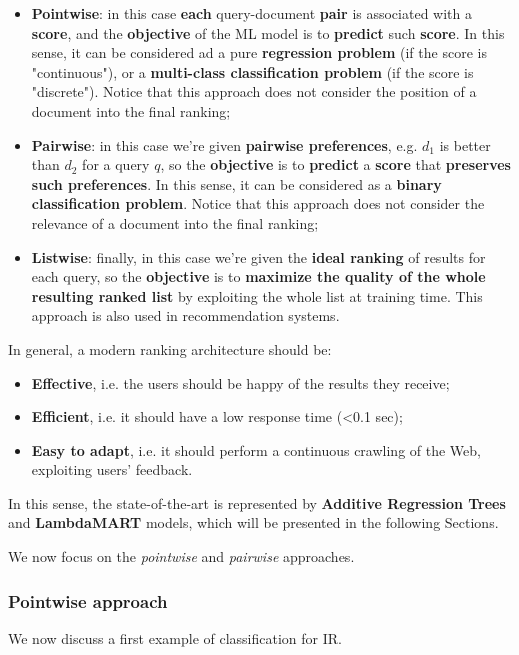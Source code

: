 \begin{itemize}
    \item \textbf{Pointwise}: in this case \textbf{each} query-document \textbf{pair} is associated with a \textbf{score}, and the \textbf{objective} of the ML model is to \textbf{predict} such \textbf{score}. In this sense, it can be considered ad a pure \textbf{regression problem} (if the score is "continuous"), or a \textbf{multi-class classification problem} (if the score is "discrete"). Notice that this approach does not consider the position of a document into the final ranking;
    \item \textbf{Pairwise}: in this case we're given \textbf{pairwise preferences}, e.g. $d_1$ is better than $d_2$ for a query $q$, so the \textbf{objective} is to \textbf{predict} a \textbf{score} that \textbf{preserves such preferences}. In this sense, it can be considered as a \textbf{binary classification problem}. Notice that this approach does not consider the relevance of a document into the final ranking;
    \item \textbf{Listwise}: finally, in this case we're given the \textbf{ideal ranking} of results for each query, so the \textbf{objective} is to \textbf{maximize the quality of the whole resulting ranked list} by exploiting the whole list at training time. This approach is also used in recommendation systems.
\end{itemize}

In general, a modern ranking architecture should be:

\begin{itemize}
    \item \textbf{Effective}, i.e. the users should be happy of the results they receive;
    \item \textbf{Efficient}, i.e. it should have a low response time (<0.1 sec);
    \item \textbf{Easy to adapt}, i.e. it should perform a continuous crawling of the Web, exploiting users' feedback.
\end{itemize}

In this sense, the state-of-the-art is represented by \textbf{Additive Regression Trees} and \textbf{LambdaMART} models, which will be presented in the following Sections. 

We now focus on the \textit{pointwise} and \textit{pairwise} approaches.

\subsubsection{Pointwise approach}
We now discuss a first example of classification for IR. 

